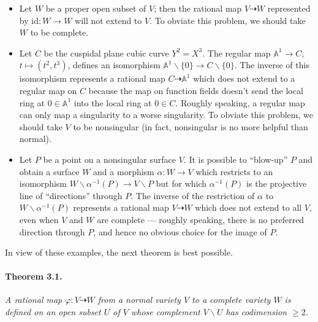 \begin{itemize}
\item[(a)] Let $W$ be a proper open subset of $V$; then the rational map
  $V \dashrightarrow W$ represented by $\mathrm{id} \colon W \to W$ will not
  extend to $V$. To obviate this problem, we should take $W$ to be complete.
\item[(b)] Let $C$ be the cuspidal plane cubic curve $Y^2 = X^3$. The
  regular map $\mathbb{A}^1 \to C$, $t \mapsto (t^2, t^3)$, defines an
  isomorphism $\mathbb{A}^1 \smallsetminus \{0\} \to C \smallsetminus \{0\}$.
  The inverse of this isomorphism represents a rational map
  $C \dashrightarrow \mathbb{A}^1$ which does not extend to a regular map on
  $C$ because the map on function fields doesn't send the local ring at
  $0 \in \mathbb{A}^1$ into the local ring at $0 \in C$. Roughly speaking, a
  regular map can only map a singularity to a worse singularity. To obviate
  this problem, we should take $V$ to be nonsingular (in fact, nonsingular
  is no more helpful than normal).
\item[(c)] Let $P$ be a point on a nonsingular surface $V$. It is possible
  to ``blow-up'' $P$ and obtain a surface $W$ and a morphism
  $\alpha \colon W \to V$ which restricts to an isomorphism
  $W \smallsetminus \alpha^{-1}(P) \to V \smallsetminus P$ but for which
  $\alpha^{-1}(P)$ is the projective line of ``directions'' through $P$. The
  inverse of the restriction of $\alpha$ to
  $W \smallsetminus \alpha^{-1}(P)$ represents a rational map
  $V \dashrightarrow W$ which does not extend to all $V$, even when $V$ and
  $W$ are complete --- roughly speaking, there is no preferred direction
  through $P$, and hence no obvious choice for the image of $P$.
\end{itemize}

In view of these examples, the next theorem is best possible.

\paragraph{Theorem 3.1.}
\textit{A rational map $\varphi \colon V \dashrightarrow W$ from a normal
variety $V$ to a complete variety $W$ is defined on an open subset $U$ of
$V$ whose complement $V \smallsetminus U$ has codimension $\ge 2$.}

